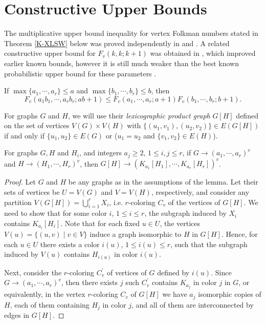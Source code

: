 \section{Constructive Upper Bounds}

The multiplicative upper bound inequality for vertex
Folkman numbers stated in Theorem \ref{K-XLSW} below
was proved independently in \cite{Nkolev2008} and \cite{XLSW}.
A related constructive upper bound for $F_v(k,k;k+1)$
was obtained in \cite{XLSW}, which improved
earlier known bounds, however it is still much weaker
than the best known probabilistic upper bound
for these parameters \cite{drr14}.

\medskip
\begin{theorem} \label{K-XLSW}
{\bf \cite{Nkolev2008,XLSW}}
If $\max\{a_1, \cdots , a_r\} \leq a$ and
$\max\{b_1, \cdots , b_r\} \leq b$, then
$$F_v(a_1 b_1, \cdots, a_r b_r; ab+1) \leq
F_v(a_1, \cdots, a_r; a+1) F_v(b_1, \cdots, b_r; b+1).$$
\end{theorem}

For graphs $G$ and $H$, we will use their
{\em lexicographic product graph} $G[H]$ defined
on the set of vertices $V(G) \times V(H)$ with
$\{(u_1,v_1),(u_2,v_2)\} \in E(G[H])$
if and only if
$\{u_1,u_2\} \in E(G)$ or
($u_1=u_2$ and $\{v_1,v_2\} \in E(H)$).

\medskip
\begin{lemma} \label{prodarrow}
For graphs $G, H$ and $H_i$, and integers $a_j \ge 2$,
$1 \le i,j \le r$,
if $G \rightarrow (a_1, \cdots,a_r)^v$
and $H \rightarrow (H_1, \cdots, H_r)^v$, then
$G[H] \rightarrow (K_{a_1}[H_1], \cdots, K_{a_r}[H_r])^v$.
\end{lemma}

\begin{proof}
Let $G$ and $H$ be any graphs as in the assumptions
of the lemma. Let their sets of vertices be
$U=V(G)$ and $V=V(H)$, respectively, and consider
any partition $V(G[H])=\bigcup_{i=1}^{r}X_i$,
i.e. $r$-coloring $C_v$
of the vertices of $G[H]$. We need to show that for
some color $i$, $1 \le i \le r$, the subgraph induced
by $X_i$ contains $K_{a_i}[H_i]$. Note that for each fixed
$u \in U$, the vertices
$V(u)=\{(u,v)\;|\;v \in V\}$ induce a graph
isomorphic to $H$ in $G[H]$. Hence, for each $u \in U$
there exists a color $i(u)$,
$1 \le i(u) \le r$, such that
the subgraph induced by $V(u)$ contains $H_{i(u)}$
in color $i(u)$.

Next, consider the $r$-coloring $C_v^{'}$
of vertices of $G$ defined by $i(u)$.
Since $G \rightarrow (a_1, \cdots,a_r)^v$,
then there exists $j$ such $C_v^{'}$
contains $K_{a_j}$ in color $j$ in $G$, or equivalently,
in the vertex $r$-coloring $C_v$
of $G[H]$ we have $a_j$ isomorphic copies of $H$,
each of them containing $H_j$ in color $j$,
and all of them are interconnected by edges in $G[H]$.
\end{proof}

